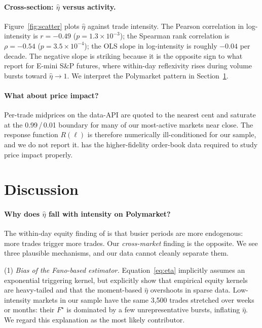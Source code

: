 \documentclass{article}
\begin{document}
\paragraph{Cross-section: $\hat\eta$ versus activity.}
Figure~\ref{fig:scatter} plots $\hat\eta$ against trade intensity. The
Pearson correlation in log-intensity is $r=-0.49$ ($p=1.3\times
10^{-3}$); the Spearman rank correlation is $\rho=-0.54$
($p=3.5\times 10^{-4}$); the OLS slope in log-intensity is roughly
$-0.04$ per decade. The negative slope is striking because it is the
opposite sign to what \citet{hardiman2013critical} report for E-mini
S\&P futures, where within-day reflexivity rises during volume bursts
toward $\hat\eta\to 1$. We interpret the Polymarket pattern in
Section~\ref{sec:discussion}.

\paragraph{What about price impact?} Per-trade midprices on the data-API
are quoted to the nearest cent and saturate at the
0.99\,/\,0.01 boundary for many of our most-active markets near
close. The response function $R(\ell)$ is therefore numerically
ill-conditioned for our sample, and we do not report
it. \citet{dubach2026anatomy} has the higher-fidelity order-book data
required to study price impact properly.

\section{Discussion}\label{sec:discussion}

\paragraph{Why does $\hat\eta$ fall with intensity on Polymarket?}
The within-day equity finding of \citet{hardiman2013critical} is that
busier periods are more endogenous: more trades trigger more trades. Our
\emph{cross-market} finding is the opposite. We see three plausible
mechanisms, and our data cannot cleanly separate them.

(1) \emph{Bias of the Fano-based estimator.} Equation~\ref{eq:eta}
implicitly assumes an exponential triggering kernel, but
\citet{hardiman2013critical} explicitly show that empirical equity
kernels are heavy-tailed and that the moment-based $\hat\eta$ overshoots
in sparse data. Low-intensity markets in our sample have the same 3,500
trades stretched over weeks or months: their $F^\star$ is dominated by
a few unrepresentative bursts, inflating $\hat\eta$. We regard this
explanation as the most likely contributor.
\end{document}
